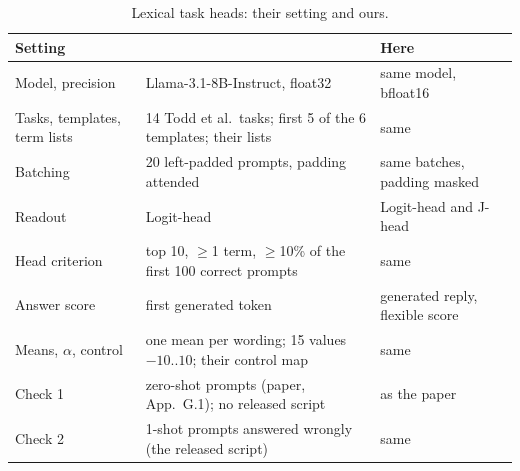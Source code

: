 \documentclass[10pt,a4paper]{article}
\begin{document}
\begin{table}[H]
\centering\small
\begin{tabularx}{\textwidth}{@{}>{\raggedright\arraybackslash}p{3.3cm}LL@{}}
\toprule
Setting & \citet{yang2026shared} & Here \\
\midrule
Model, precision & Llama-3.1-8B-Instruct, float32 & same model, bfloat16 \\
Tasks, templates, term lists & 14 Todd et al.\ tasks; first 5 of the 6 templates; their lists & same \\
Batching & 20 left-padded prompts, padding attended & same batches, padding masked \\
Readout & Logit-head & Logit-head and J-head \\
Head criterion & top 10, $\geq$1 term, $\geq$10\% of the first 100 correct prompts & same \\
Answer score & first generated token & generated reply, flexible score \\
Means, $\alpha$, control & one mean per wording; 15 values $-10$..$10$; their control map & same \\
Check 1 & zero-shot prompts (paper, App.~G.1); no released script & as the paper \\
Check 2 & 1-shot prompts answered wrongly (the released script) & same \\
\bottomrule
\end{tabularx}
\caption{Lexical task heads: their setting and ours.}
\label{tab:fid-yang}
\end{table}
\end{document}
